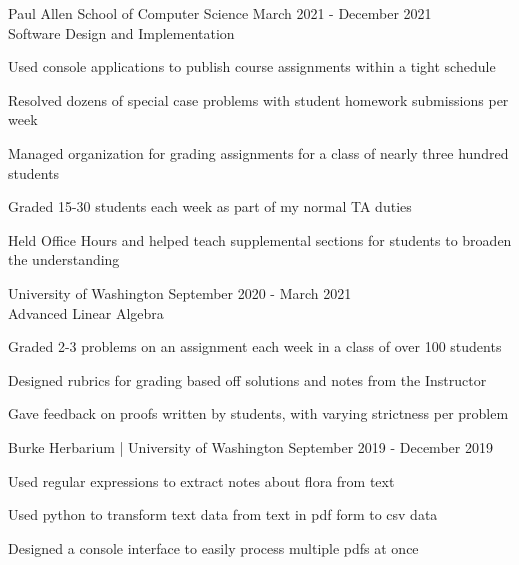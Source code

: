 \documentclass[10pt]{article}
\newenvironment{itemize*}
{\begin{itemize}[leftmargin=*]
    \setlength{\parskip}{0.5pt}}
{\end{itemize}}
\begin{document}
\begin{description}[leftmargin=!,
                    labelwidth=\widthof{\bfseries Teaching Assistant}]

\item[Teaching Assistant] Paul Allen School of Computer Science \hfill 
    March 2021 - December 2021\\
    Software Design and Implementation
\end{description}
\begin{itemize*}
\item Used console applications to publish course assignments within a tight schedule
\item Resolved dozens of special case problems with student homework submissions per week
\item Managed organization for grading assignments for a class of nearly three hundred students
\item Graded 15-30 students each week as part of my normal TA duties
\item Held Office Hours and helped teach supplemental sections for students to
    broaden the understanding
\end{itemize*}
\vspace{10pt}

\begin{description}[leftmargin=!,
                    labelwidth=\widthof{\bfseries Grader}]
\item[Grader] University of Washington \hfill
    September 2020 - March 2021\\
    Advanced Linear Algebra
\end{description}
\begin{itemize*}
\item Graded 2-3 problems on an assignment each week in a class of over 100 students
\item Designed rubrics for grading based off solutions and notes from the Instructor
\item Gave feedback on proofs written by students, with varying strictness per problem
\end{itemize*}
\vspace{10pt}

\begin{description}[leftmargin=!,
                    labelwidth=\widthof{\bfseries Lab Assistant}]
\item[Lab Assistant] Burke Herbarium | University of Washington \hfill
    September 2019 - December 2019\\
\end{description}
\begin{itemize*}
\item Used regular expressions to extract notes about flora from text
\item Used python to transform text data from text in pdf form to csv data
\item Designed a console interface to easily process multiple pdfs at once
\end{itemize*}
\vspace{10pt}
\end{document}
